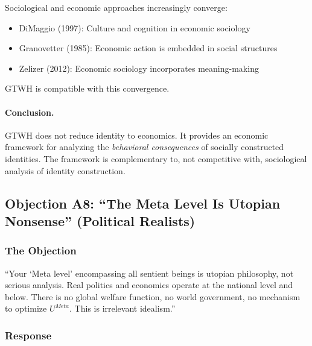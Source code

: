 \documentclass[12pt,a4paper]{article}
\begin{document}
Sociological and economic approaches increasingly converge:
\begin{itemize}[nosep]
\item DiMaggio (1997): Culture and cognition in economic sociology
\item Granovetter (1985): Economic action is embedded in social structures
\item Zelizer (2012): Economic sociology incorporates meaning-making
\end{itemize}

GTWH is compatible with this convergence.

\paragraph{Conclusion.}

GTWH does not reduce identity to economics. It provides an economic framework 
for analyzing the \textit{behavioral consequences} of socially constructed 
identities. The framework is complementary to, not competitive with, 
sociological analysis of identity construction.

\subsection{Objection A8: ``The Meta Level Is Utopian Nonsense'' (Political Realists)}
\label{app:meta-level}

\subsubsection{The Objection}

\begin{tcolorbox}[colback=red!5!white, colframe=red!75!black, title=Realist's Objection]
``Your `Meta level' encompassing all sentient beings is utopian philosophy, 
not serious analysis. Real politics and economics operate at the national 
level and below. There is no global welfare function, no world government, 
no mechanism to optimize $U^{Meta}$. This is irrelevant idealism.''
\end{tcolorbox}

\subsubsection{Response}
\end{document}
